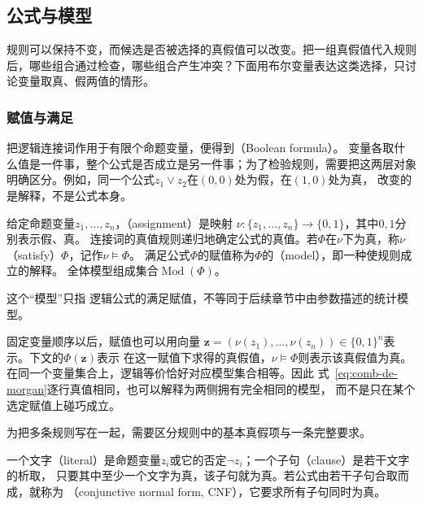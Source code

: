 \subsection{公式与模型}
\label{sec:prelim-formulas-models}

规则可以保持不变，而候选是否被选择的真假值可以改变。把一组真假值代入规则后，哪些组合通过检查，哪些组合产生冲突？下面用布尔变量表达这类选择，只讨论变量取真、假两值的情形。

\subsubsection{赋值与满足}
\label{sec:prelim-assignment-satisfaction}

把逻辑连接词作用于有限个命题变量，便得到（Boolean formula）。
变量各取什么值是一件事，整个公式是否成立是另一件事；为了检验规则，需要把这两层对象
明确区分。例如，同一个公式$z_1\lor z_2$在$(0,0)$处为假，在$(1,0)$处为真，
改变的是解释，不是公式本身。

\begin{definition}[赋值与公式的模型]
\label{def:comb-assignment-model}
给定命题变量$z_1,\ldots,z_n$，（assignment）是映射
$\nu:\{z_1,\ldots,z_n\}\to\{0,1\}$，其中$0,1$分别表示假、真。
连接词的真值规则递归地确定公式的真值。若$\Phi$在$\nu$下为真，称$\nu$
（satisfy）$\Phi$，记作$\nu\models\Phi$。
满足公式$\Phi$的赋值称为$\Phi$的（model），即一种使规则成立的解释。
全体模型组成集合$\operatorname{Mod}(\Phi)$。
\end{definition}
这个“模型”只指
逻辑公式的满足赋值，不等同于后续章节中由参数描述的统计模型。

固定变量顺序以后，赋值也可以用向量
$\bm{z}=(\nu(z_1),\ldots,\nu(z_n))\in\{0,1\}^n$表示。下文的$\Phi(\bm{z})$表示
在这一赋值下求得的真假值，$\nu\models\Phi$则表示该真假值为真。
在同一个变量集合上，逻辑等价恰好对应模型集合相等。因此
式~\eqref{eq:comb-de-morgan}逐行真值相同，也可以解释为两侧拥有完全相同的模型，
而不是只在某个选定赋值上碰巧成立。

为把多条规则写在一起，需要区分规则中的基本真假项与一条完整要求。
\begin{definition}[文字、子句与合取范式]
\label{def:comb-literals-cnf}
一个文字（literal）是命题变量$z_i$或它的否定$\neg z_i$；一个子句（clause）是若干文字的析取，
只要其中至少一个文字为真，该子句就为真。若公式由若干子句合取而成，就称为
（conjunctive normal form, CNF），它要求所有子句同时为真。
\end{definition}

